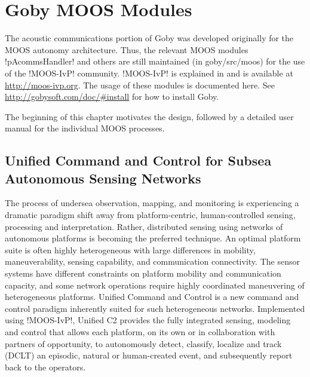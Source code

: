 \chapter{Goby MOOS Modules}\label{chap:MOOS}
\MakeShortVerb{\!} %

The acoustic communications portion of Goby was developed originally for the MOOS autonomy architecture. Thus, the relevant MOOS modules !pAcommsHandler! and others are still maintained (in goby/src/moos) for the use of the !MOOS-IvP! community. !MOOS-IvP! is explained in \cite{moos-ivp-jfr} and is available at \url{http://moos-ivp.org}. The usage of these modules is documented here. See \url{http://gobysoft.com/doc/#install} for how to install Goby.

The beginning of this chapter motivates the design, followed by a detailed user manual for the individual MOOS processes.

\section{Unified Command and Control for Subsea Autonomous Sensing Networks}

The process of undersea observation, mapping, and monitoring is experiencing a dramatic
paradigm shift away from platform-centric, human-controlled sensing,
processing and interpretation. Rather, distributed sensing
using networks of autonomous platforms is becoming the preferred technique.
An optimal platform suite is often highly heterogeneous with large differences in mobility,
maneuverability, sensing capability, and communication connectivity.  The
sensor systems have different constraints on platform mobility and
communication capacity, and some network operations require highly
coordinated maneuvering of heterogeneous platforms. Unified Command and Control \cite{unified_c2} is a new command and control paradigm inherently suited for such heterogeneous networks. Implemented using
!MOOS-IvP!, Unified C2 provides the fully integrated sensing,
modeling and control that allows each platform, on its own or in
collaboration with partners of opportunity, to autonomously detect,
classify, localize and track (DCLT) an episodic, natural or human-created event, and
subsequently report back to the operators.

